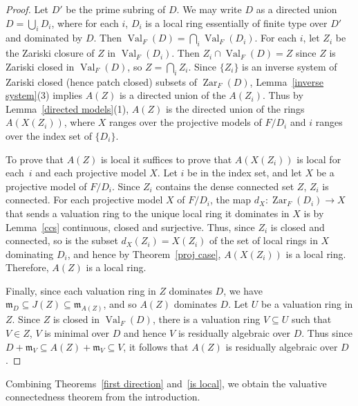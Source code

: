 \documentclass[preprint, 11pt,nonatbib]{elsarticle}
\DeclareMathOperator{\Dom}{Val}
\DeclareMathOperator{\Zar}{Zar}
\theoremstyle{definition}
\numberwithin{theorem}{section}
\begin{document}
\begin{proof}
Let $D'$ be the prime subring of $D$. 
We may write $D $ as a directed union $D= \bigcup_{i} D_i$, where for each $i$, $D_i$ is a local ring essentially of finite type over $D'$ and dominated by $D$.  
Then $\Dom_F(D) = \bigcap_{i} \Dom_F(D_i)$.
 For each $i$, let 
 $Z_i$ be the Zariski closure of ${Z}$ in  $\Dom_F(D_i)$. Then $Z_i \cap \Dom_F(D) = Z$ since $Z$ is Zariski closed in $\Dom_F(D)$, so 
  $Z = \bigcap_i Z_i$. Since $\{Z_i\}$ is an inverse system of Zariski closed (hence patch closed) subsets of $\Zar_F(D)$,
  Lemma~\ref{inverse system}(3) implies $A(Z)$ is a directed union of the $A(Z_i)$. Thus by Lemma~\ref{directed models}(1), $A(Z)$ is the directed union of the rings $A(X(Z_i))$, where $X$ ranges over the  projective models of $F/D_i$ and $i$ ranges over the index set of $\{D_i\}$. 
  
  To prove that $A(Z)$ is local it suffices to prove that $A({X}(Z_i))$ is local for each~$i$ and  each projective model $X$.  
  Let $i$ be in the index set, and let $X$ be a projective model of $F/D_i$. 
 Since $Z_i$ contains the dense connected set $Z$, $Z_i$ is connected. 
 For each   projective model $X$ of $F/D_i$, the map $d_X:\Zar_F(D_i) \rightarrow X$  that sends a valuation ring to the unique local ring it dominates in $X$ is by Lemma~\ref{ccs}  continuous, closed and surjective.
 Thus, since $Z_i$ is    closed and connected, so is the subset $d_{X}(Z_i)=X(Z_i)$ of the set of local rings in $X$ dominating $D_i$,
 and hence by Theorem~\ref{proj case},  $A(X(Z_i))$ is a local ring. Therefore, $A(Z)$ is a local ring.  

 Finally, since each valuation ring in $Z$ dominates $D$, we have ${\mathfrak{m}}_D \subseteq J(Z) \subseteq {\mathfrak{m}}_{A(Z)}$, and so $A(Z)$  dominates $D$.  
 Let $U$ be a valuation ring in $Z$. Since $Z$ is closed in $\Dom_F(D)$, there is a valuation ring $V \subseteq U$ such that $V \in Z$, $V$ is minimal over $D$ and hence $V$ is residually algebraic over $D$.  Thus since $D +{\mathfrak{m}}_V \subseteq A(Z)+{\mathfrak{m}}_V  \subseteq V$, it follows that $A(Z)$ is residually algebraic over $D$. 
\end{proof}


Combining Theorems~\ref{first direction} and~\ref{is local}, we obtain the valuative connectedness theorem from the introduction. 


  
 
\end{document}
